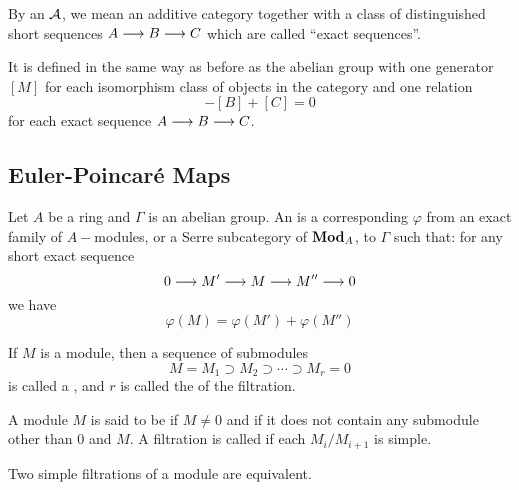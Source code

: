   By an  ${\cal A}$, we mean an additive category together with a class of distinguished short sequences $A\longrightarrow B\longrightarrow C$ which are called ``exact sequences''.

  It is defined in the same way as before as the abelian group with one generator $[M]$ for each isomorphism class of objects in the category and one relation
  \begin{equation*}
    [A]-[B]+[C]=0
  \end{equation*}
  for each exact sequence $A\longrightarrow B\longrightarrow C$.

\subsection{Euler-Poincar\'{e} Maps}

  \begin{defn}
    Let $A$ be a ring and $\Gamma$ is an abelian group. An  is a corresponding $\varphi$ from an exact family of $A-$modules, or a Serre subcategory of $\operatorname{\mathbf{Mod}}_A$, to $\Gamma$ such that: for any short exact sequence
    \begin{equation*}
      0\longrightarrow M'\longrightarrow M\longrightarrow M''\longrightarrow 0
    \end{equation*}
    we have
    \begin{equation*}
      \varphi(M)=\varphi(M')+\varphi(M'')
    \end{equation*}
  \end{defn}

  \begin{defn}
    If $M$ is a module, then a sequence of submodules
    \begin{equation*}
      M=M_1\supset M_2\supset\cdots\supset M_r=0
    \end{equation*}
    is called a , and $r$ is called the  of the filtration.
  \end{defn}

  \begin{defn}
    A module $M$ is said to be  if $M\neq0$ and if it does not contain any submodule other than $0$ and $M$.
    A filtration is called  if each $M_i/M_{i+1}$ is simple.
  \end{defn}

  \begin{thm}
    Two simple filtrations of a module are equivalent.
  \end{thm}

